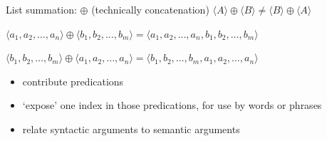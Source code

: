 \documentclass[a4paper,landscape,headrule,footrule]{foils}
\begin{document}
List summation: $\oplus$ (technically concatenation) 
$\langle A \rangle \oplus \langle B \rangle \ne 
\langle B \rangle \oplus \langle A \rangle$

$\langle a_1, a_2, \ldots, a_n \rangle \oplus \langle b_1, b_2, \ldots, b_m \rangle = 
\langle a_1, a_2, \ldots, a_n,  b_1, b_2, \ldots, b_m \rangle $

$ \langle b_1, b_2, \ldots, b_m \rangle \oplus \langle a_1, a_2, \ldots, a_n \rangle = 
\langle b_1, b_2, \ldots, b_m,   a_1, a_2, \ldots, a_n \rangle $






\begin{itemize}
\item contribute predications
\item ‘expose’ one index in those predications, for use by words or phrases
\item relate syntactic arguments to semantic arguments
 \\ 
\end{itemize}
\end{document}
